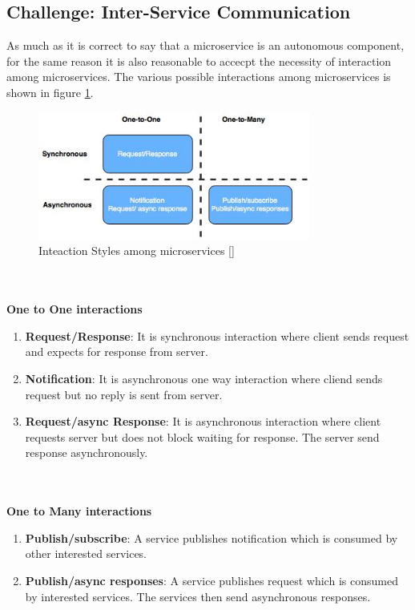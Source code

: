 \subsection{Challenge: Inter-Service Communication}\label{section:challanges_of_microservices_architecture/integration/inter_service_communication}
As much as it is correct to say that a microservice is an autonomous component, for the same reason it is also reasonable to accecpt the necessity of interaction among microservices. The various possible interactions among microservices is shown in figure \ref{fig:challanges_of_microservices_architecture/integration/inter_service_communication/interaction_styles_among_microservices}.\cite{Richardson:2015ab}
\begin{figure}[H]
\begin{center}
\includegraphics[width=0.8\textwidth]{figures/challenges_one_interaction_styles}
\caption{Inteaction Styles among microservices [\cite{Richardson:2015ab}]}
\label{fig:challanges_of_microservices_architecture/integration/inter_service_communication/interaction_styles_among_microservices}
\end{center}
\end{figure}
\\
\\
\textbf{One to One interactions}
\\
\begin{enumerate}
\item \textbf{Request/Response}: It is synchronous interaction where client sends request and expects for response from server.
\item \textbf{Notification}: It is asynchronous one way interaction where cliend sends request but no reply is sent from server.
\item \textbf{Request/async Response}: It is asynchronous interaction where client requests server but does not block waiting for response. The server send response asynchronously.
\end{enumerate}
\\
\\
\textbf{One to Many interactions}
\\
\begin{enumerate}
\item \textbf{Publish/subscribe}: A service publishes notification which is consumed by other interested services.
\item \textbf{Publish/async responses}: A service publishes request which is consumed by interested services. The services then send asynchronous responses.
\end{enumerate}
\\
\\

